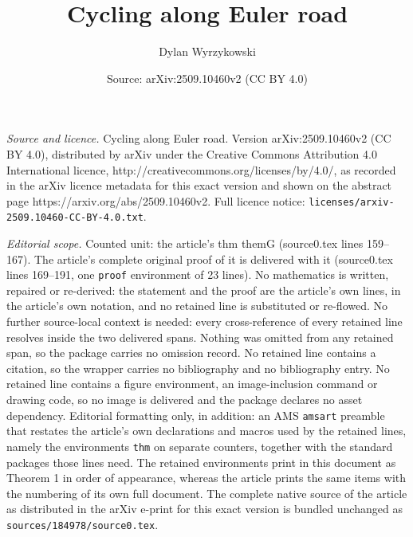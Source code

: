 \documentclass[10pt,a4paper]{amsart}
\title{Cycling along Euler road}
\author{Dylan Wyrzykowski}
\date{Source: arXiv:2509.10460v2 (CC BY 4.0)}
\begin{document}
\maketitle

\noindent\emph{Source and licence.} Cycling along Euler road. Version arXiv:2509.10460v2 (CC BY 4.0), distributed by arXiv under the Creative Commons Attribution 4.0 International licence, http://creativecommons.org/licenses/by/4.0/, as recorded in the arXiv licence metadata for this exact version and shown on the abstract page https://arxiv.org/abs/2509.10460v2. Full licence notice: \texttt{licenses/arxiv-2509.10460-CC-BY-4.0.txt}.\par\smallskip

\noindent\textit{Editorial scope.} Counted unit: the article's thm themG (source0.tex lines 159--167). The article's complete original proof of it is delivered with it (source0.tex lines 169--191, one \texttt{proof} environment of 23 lines). No mathematics is written, repaired or re-derived: the statement and the proof are the article's own lines, in the article's own notation, and no retained line is substituted or re-flowed.  No further source-local context is needed: every cross-reference of every retained line resolves inside the two delivered spans.  Nothing was omitted from any retained span, so the package carries no omission record.  No retained line contains a citation, so the wrapper carries no bibliography and no bibliography entry.  No retained line contains a figure environment, an image-inclusion command or drawing code, so no image is delivered and the package declares no asset dependency.  Editorial formatting only, in addition: an AMS \texttt{amsart} preamble that restates the article's own declarations and macros used by the retained lines, namely the environments \texttt{thm} on separate counters, together with the standard packages those lines need.  The retained environments print in this document as Theorem 1 in order of appearance, whereas the article prints the same items with the numbering of its own full document.  The complete native source of the article as distributed in the arXiv e-print for this exact version is bundled unchanged as \texttt{sources/184978/source0.tex}.
\end{document}

